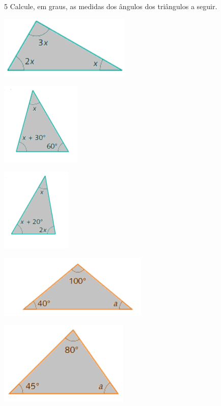 \num{5} Calcule, em graus, as medidas dos ângulos dos triângulos a seguir.

\begin{multicols}{2}
\begin{escolha}
\item \includegraphics[height=3cm]{./imgSAEB_8_MAT/media/image24.png}

\item \includegraphics[height=4cm]{./imgSAEB_8_MAT/media/image25.png}

\item \includegraphics[height=4cm]{./imgSAEB_8_MAT/media/image26.png}

\item \includegraphics[height=3cm]{./imgSAEB_8_MAT/media/image27.png}

\item \includegraphics[height=4cm]{./imgSAEB_8_MAT/media/image28.png}


\end{escolha}
\end{multicols}
